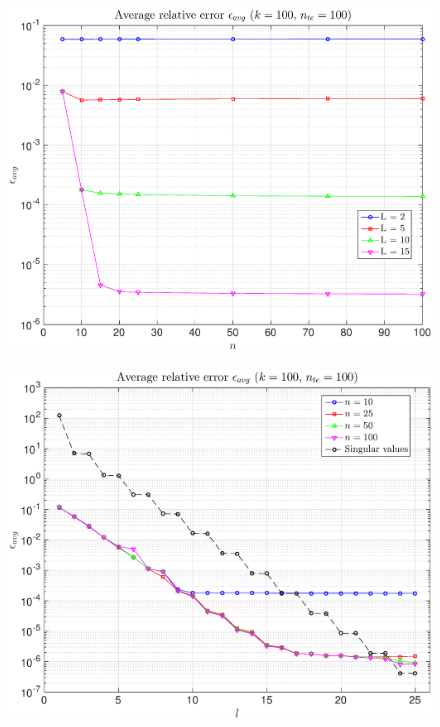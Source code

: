 \documentclass[11pt,a4paper]{article}
\theoremstyle{definition}
\theoremstyle{theorem}
\numberwithin{equation}{section}
\begin{document}
	\begin{figure}[H]
		\center
		\includegraphics[scale = 0.5]{fig16}
		\caption{}
	\end{figure}
	
	\begin{figure}[H]
		\center
		\includegraphics[scale = 0.5]{fig17}
		\caption{}
	\end{figure}
	
\end{document}
